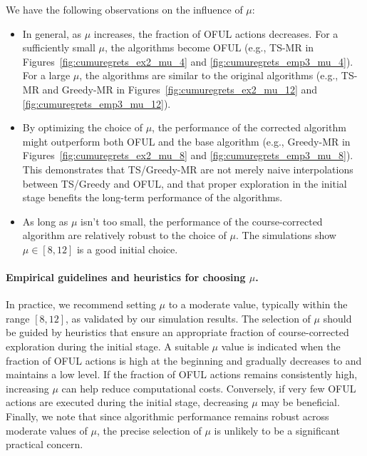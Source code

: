 We have the following observations on the influence of $\mu$:
\begin{itemize}
    \item In general, as $\mu$ increases, the fraction of OFUL actions decreases. For a sufficiently small $\mu$, the algorithms become OFUL (e.g., TS-MR in Figures~\ref{fig:cumuregrets_ex2_mu_4} and \ref{fig:cumuregrets_emp3_mu_4}). For a large $\mu$, the algorithms are similar to the original algorithms (e.g., TS-MR and Greedy-MR in Figures~\ref{fig:cumuregrets_ex2_mu_12} and \ref{fig:cumuregrets_emp3_mu_12}). 
    \item By optimizing the choice of $\mu$, the performance of the corrected algorithm might outperform both OFUL and the base algorithm (e.g., Greedy-MR in Figures~\ref{fig:cumuregrets_ex2_mu_8} and \ref{fig:cumuregrets_emp3_mu_8}). This demonstrates that TS/Greedy-MR are not merely naive interpolations between TS/Greedy and OFUL, and that proper exploration in the initial stage benefits the long-term performance of the algorithms.
    
    \item As long as $\mu$ isn't too small,  the performance of the course-corrected algorithm are relatively robust to the choice of $\mu$. The simulations show $\mu\in[8,12]$ is a good initial choice.
\end{itemize}

\paragraph{Empirical guidelines and heuristics for choosing $\mu$.} In practice, we recommend setting $\mu$ to a moderate value, typically within the range $[8,12]$, as validated by our simulation results. The selection of $\mu$ should be guided by heuristics that ensure an appropriate fraction of course-corrected exploration during the initial stage. A suitable $\mu$ value is indicated when the fraction of OFUL actions is high at the beginning and gradually decreases to and maintains a low level. If the fraction of OFUL actions remains consistently high, increasing $\mu$ can help reduce computational costs. Conversely, if very few OFUL actions are executed during the initial stage, decreasing $\mu$ may be beneficial. Finally, we note that since algorithmic performance remains robust across moderate values of $\mu$, the precise selection of $\mu$ is unlikely to be a significant practical concern.




